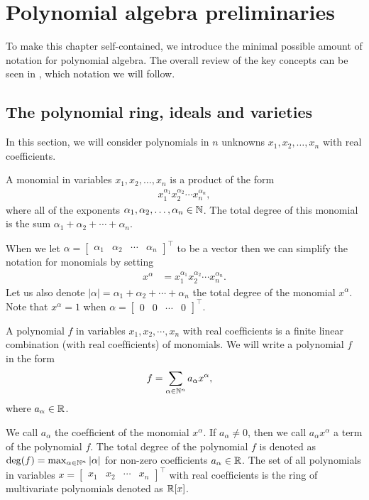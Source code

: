 \section{Polynomial algebra preliminaries}
To make this chapter self-contained, we introduce the minimal possible amount of notation for polynomial algebra.
The overall review of the key concepts can be seen in \cite{Cox-Little-Shea2015}, which notation we will follow.

\subsection{The polynomial ring, ideals and varieties}
In this section, we will consider polynomials in $n$ unknowns $x_1, x_2, \ldots, x_n$ with real coefficients.

\begin{definition}
  A monomial in variables $x_1, x_2, \ldots , x_n$ is a product of the form
  \begin{align}
    x_1^{\alpha_1} x_2^{\alpha_2} \cdots x_n^{\alpha_n},
  \end{align}
  where all of the exponents $\alpha_1, \alpha_2, \ldots, \alpha_n \in \mathbb{N}$.
  The total degree of this monomial is the sum $\alpha_1 + \alpha_2 + \cdots + \alpha_n$.
\end{definition}

When we let $\alpha = \begin{bmatrix}\alpha_1 & \alpha_2 & \cdots & \alpha_n\end{bmatrix}^\top$ to be a vector then we can simplify the notation for monomials by setting
\begin{align}
  x^\alpha &= x_1^{\alpha_1} x_2^{\alpha_2} \cdots x_n^{\alpha_n}.
\end{align}
Let us also denote $|\alpha| = \alpha_1 + \alpha_2 + \cdots + \alpha_n$ the total degree of the monomial $x^\alpha$.
Note that $x^\alpha = 1$ when $\alpha = \begin{bmatrix}0 & 0 & \cdots & 0\end{bmatrix}^\top$.

\begin{definition}
  A polynomial $f$ in variables $x_1, x_2, \cdots, x_n$ with real coefﬁcients is a ﬁnite linear combination (with real coefﬁcients) of monomials.
  We will write a polynomial $f$ in the form
  \begin{align}
    f &= \sum_{\alpha\in\mathbb{N}^n} a_\alpha x^\alpha,
  \end{align}
where $a_\alpha\in\mathbb{R}$.
\end{definition}

We call $a_\alpha$ the coefﬁcient of the monomial $x^\alpha$.
If $a_\alpha \neq 0$, then we call $a_\alpha x^\alpha$ a term of the polynomial $f$.
The total degree of the polynomial $f$ is denoted as $\deg(f) = \max_{\alpha\in\mathbb{N}^n} |\alpha|$ for non-zero coefficients $a_\alpha\in\mathbb{R}$.
The set of all polynomials in variables $x = \begin{bmatrix}x_1 & x_2 & \cdots & x_n\end{bmatrix}^\top$ with real coefﬁcients is the ring of multivariate polynomials denoted as $\mathbb{R}[x]$.
